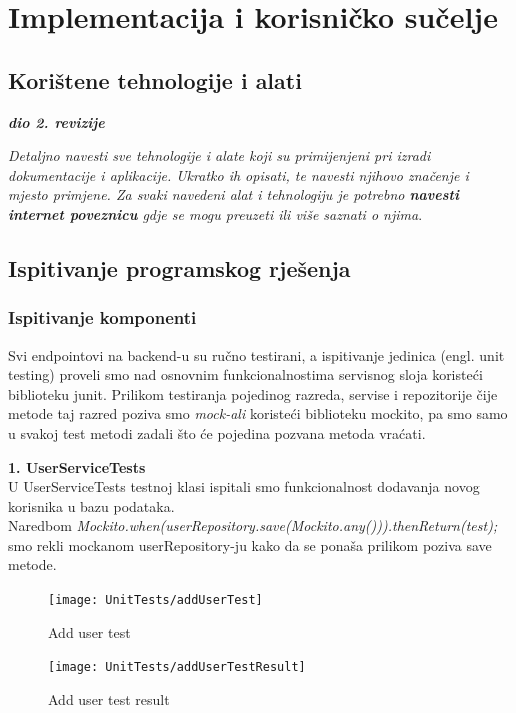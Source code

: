 \chapter{Implementacija i korisničko sučelje}
		
		\section{Korištene tehnologije i alati}
		
			\textbf{\textit{dio 2. revizije}}
			
			 \textit{Detaljno navesti sve tehnologije i alate koji su primijenjeni pri izradi dokumentacije i aplikacije. Ukratko ih opisati, te navesti njihovo značenje i mjesto primjene. Za svaki navedeni alat i tehnologiju je potrebno \textbf{navesti internet poveznicu} gdje se mogu preuzeti ili više saznati o njima}.
			
			
			\eject 
		
	
		\section{Ispitivanje programskog rješenja}
			
			\subsection{Ispitivanje komponenti}
			{Svi endpointovi na backend-u su ručno testirani, a ispitivanje jedinica (engl. unit testing) proveli smo nad osnovnim funkcionalnostima servisnog sloja koristeći biblioteku junit. Prilikom testiranja pojedinog razreda, servise i repozitorije čije metode taj razred poziva smo \textit{mock-ali} koristeći biblioteku mockito, pa smo samo u svakoj test metodi zadali što će pojedina pozvana metoda vraćati.}
			
			\textbf{1. UserServiceTests\\}
			{U UserServiceTests testnoj klasi ispitali smo funkcionalnost dodavanja novog korisnika u bazu podataka.\\
			Naredbom \textit{Mockito.when(userRepository.save(Mockito.any())).thenReturn(test);} smo rekli mockanom userRepository-ju kako da se ponaša prilikom poziva save metode.}
			\begin{figure}[H]
				\texttt{[image: UnitTests/addUserTest]}
				\centering
				\caption{Add user test}
				\label{fig:addUserTest}
			\end{figure}
			\begin{figure}[H]
				\texttt{[image: UnitTests/addUserTestResult]}
				\centering
				\caption{Add user test result}
				\label{fig:addUserTestResult}
			\end{figure}
			

